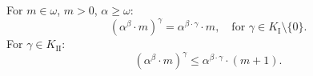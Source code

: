 For $m \in \omega$, $m > 0$, $\alpha \ge \omega$:
$$(\alpha^\beta \cdot m)^\gamma = \alpha^{\beta \cdot \gamma} \cdot m, \quad \text{for } \gamma \in K_{\mathrm{I}} \setminus \{0\}.$$
For $\gamma \in K_{\mathrm{II}}$:
$$(\alpha^\beta \cdot m)^\gamma \le \alpha^{\beta \cdot \gamma} \cdot (m + 1).$$
